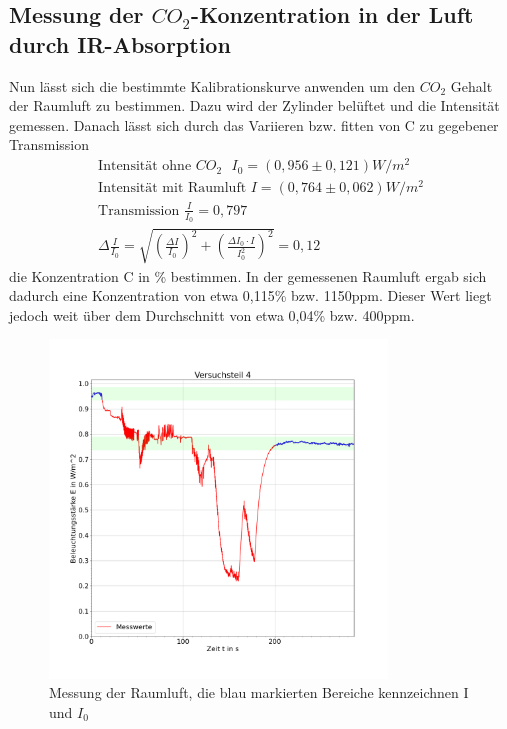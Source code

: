 \documentclass{article}
\begin{document}
            \subsection{Messung der $CO_2$-Konzentration in der Luft durch IR-Absorption}
            Nun lässt sich die bestimmte Kalibrationskurve anwenden um den $CO_2$ Gehalt der
            Raumluft zu bestimmen. Dazu wird der Zylinder belüftet und die Intensität gemessen.
            Danach lässt sich durch das Variieren bzw. fitten von C zu gegebener Transmission
            \begin{equation}
                \begin{aligned}
                    \text{Intensität ohne $CO_2$ } I_0 = (0,956\pm0,121)W/m^2 \\
                    \text{Intensität mit Raumluft } I = (0,764\pm0,062)W/m^2 \\  
                    \text{Transmission } \frac{I}{I_0} = 0,797 \\
                    \Delta \frac{I}{I_0} = \sqrt{(\frac{\Delta I}{I_0})^2 + (\frac{\Delta I_0 \cdot I}{I_0^2})^2} = 0,12
                \end{aligned}
            \end{equation} 
            die Konzentration C in \% bestimmen. In der gemessenen Raumluft ergab sich dadurch eine
            Konzentration von etwa 0,115\% bzw. 1150ppm. Dieser Wert liegt jedoch weit über dem Durchschnitt 
            von etwa 0,04\% bzw. 400ppm.
            \begin{figure}[H]
                \centering
                \includegraphics[width=0.8\textwidth]{Daten/LuftPlot.png}
                \caption{Messung der Raumluft, die blau markierten Bereiche kennzeichnen I und $I_0$}
            \end{figure}
\end{document}

